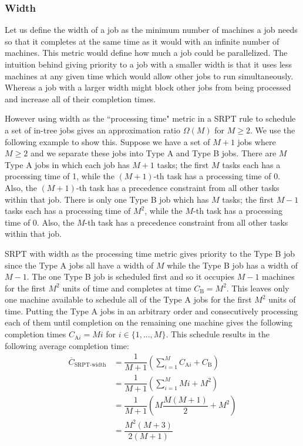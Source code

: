 
\subsubsection{Width}

Let us define the width of a job as the minimum number of machines a job needs so that it completes at the same time as it would with an infinite number of machines.
This metric would define how much a job could be parallelized.
The intuition behind giving priority to a job with a smaller width is that it uses less machines at any given time which would allow other jobs to run simultaneously.  Whereas a job with a larger width might block other jobs from being processed and increase all of their completion times.

However using width as the ``processing time" metric in a SRPT rule to schedule a set of in-tree jobs gives an approximation ratio $\Omega(M)$ for $M\geq 2$.
We use the following example to show this.
Suppose we have a set of $M+1$ jobs where $M\geq 2$ and we separate these jobs into Type A and Type B jobs.
There are $M$ Type A jobs in which each job has $M+1$ tasks; the first $M$ tasks each has a processing time of 1, while the $(M+1)$-th task has a processing time of 0.
Also, the $(M+1)$-th task has a precedence constraint from all other tasks within that job.
There is only one Type B job which has $M$ tasks; the first $M-1$ tasks each has a processing time of $M^2$, while the $M$-th task has a processing time of 0.
Also, the $M$-th task has a precedence constraint from all other tasks within that job.

SRPT with width as the processing time metric gives priority to the Type B job since the Type A jobs all have a width of $M$ while the Type B job has a width of $M-1$.
The one Type B job is scheduled first and so it occupies $M-1$ machines for the first $M^2$ units of time and completes at time $C_\text{B}=M^2$.
This leaves only one machine available to schedule all of the Type A jobs for the first $M^2$ units of time.
Putting the Type A jobs in an arbitrary order and consecutively processing each of them until completion on the remaining one machine gives the following completion times $C_{\text{A}i}=Mi$ for $i\in\{1,...,M\}$.
This schedule results in the following average completion time:
\begin{align}
	\overline{C}_\text{SRPT-width} & = \dfrac{1}{M+1}\left(\sum_{i=1}^M C_{\text{A}i} + C_\text{B}\right) \nonumber \\
	& = \dfrac{1}{M+1}\left(\sum_{i=1}^M Mi + M^2\right) \nonumber \\
	& = \dfrac{1}{M+1}\left(M\dfrac{M(M+1)}{2} + M^2\right) \nonumber \\
	& = \dfrac{M^2(M+3)}{2(M+1)}
\end{align}

